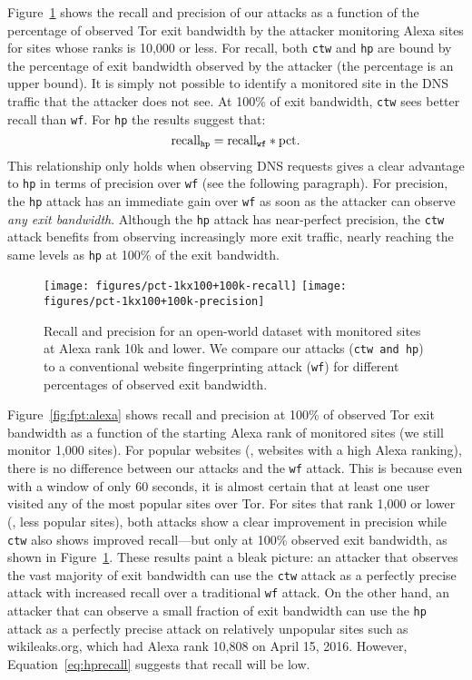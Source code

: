 Figure~\ref{fig:fpt:torpct} shows the recall and precision of our \name
attacks as a function of the percentage of observed Tor exit bandwidth by the
attacker monitoring Alexa sites for sites whose ranks is 10,000 or less.
For recall, both \texttt{ctw} and \texttt{hp} are bound by the
percentage of exit bandwidth observed by the attacker (the percentage is an
upper bound).
It is simply not possible to identify a monitored site in the DNS traffic that
the attacker does not see. At 100\% of exit bandwidth, \texttt{ctw} sees
better recall than \texttt{wf}. For \texttt{hp} the results suggest that:
\begin{equation}
	\label{eq:hprecall}
	\textnormal{recall}_{\texttt{hp}} = \textnormal{recall}_{\texttt{wf}} * \textnormal{pct}.
\end{equation}
This relationship only holds when observing DNS requests gives
a clear advantage to \texttt{hp} in terms of precision over \texttt{wf} (see
the following paragraph).
For precision, the \texttt{hp} attack has an immediate gain over \texttt{wf} as
soon as the attacker can observe {\it any exit bandwidth}.
Although the \texttt{hp} attack has near-perfect precision, the
\texttt{ctw} attack benefits from observing increasingly more exit traffic,
nearly reaching the same levels as \texttt{hp} at 100\% of the exit bandwidth.


\begin{figure}[t]
\centering
\texttt{[image: figures/pct-1kx100+100k-recall]}
\texttt{[image: figures/pct-1kx100+100k-precision]}
\caption{Recall and precision for an open-world dataset with monitored sites
at Alexa rank 10k and lower. We compare our \name attacks (\texttt{ctw and
 \texttt{hp}}) to a conventional website fingerprinting attack (\texttt{wf}) for different
 percentages of observed exit bandwidth. }
\label{fig:fpt:torpct}
\end{figure}


Figure~\ref{fig:fpt:alexa} shows recall and precision at 100\% of
observed Tor exit bandwidth as a function of the starting Alexa rank of
monitored sites (we still monitor 1,000 sites).
For popular websites (\ie, websites with a high Alexa ranking),
there is no difference between our attacks and the
\texttt{wf} attack. This is because even with a window of only 60 seconds,
it is almost certain that at least one user visited any of the most popular
sites over Tor. For sites that rank 1,000 or lower (\ie, less popular sites),
both \name attacks show a clear improvement in precision while
\texttt{ctw} also shows improved recall---but only at 100\% observed exit
bandwidth, as shown in Figure~\ref{fig:fpt:torpct}.
These results paint a bleak picture: an attacker that observes the
vast majority of exit bandwidth can use the \texttt{ctw} attack as a perfectly
precise attack with increased recall over a traditional \texttt{wf} attack.
On the other hand, an attacker that can observe a small fraction of exit
bandwidth can use the \texttt{hp} attack as a perfectly precise attack on
relatively {unpopular} sites such as wikileaks.org, which had Alexa rank 10,808
on April 15, 2016.  However, Equation~\ref{eq:hprecall} suggests that
recall will be low.

